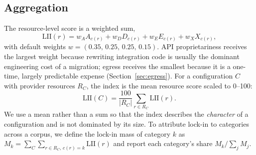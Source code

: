 \documentclass[conference]{IEEEtran}
\begin{document}
\subsection{Aggregation}
The resource-level score is a weighted sum,
\begin{equation}
\mathrm{LII}(r) = w_A A_{c(r)} + w_D D_{c(r)} + w_E E_{c(r)} + w_X X_{c(r)},
\label{eq:res}
\end{equation}
with default weights $w=(0.35,\,0.25,\,0.25,\,0.15)$. API proprietariness receives the largest weight because rewriting integration code is usually the dominant engineering cost of a migration; egress receives the smallest because it is a one-time, largely predictable expense (Section~\ref{sec:egress}). For a configuration $C$ with provider resources $R_C$, the index is the mean resource score scaled to 0--100:
\begin{equation}
\mathrm{LII}(C) = \frac{100}{|R_C|}\sum_{r\in R_C}\mathrm{LII}(r).
\label{eq:cfg}
\end{equation}
We use a mean rather than a sum so that the index describes the \emph{character} of a configuration and is not dominated by its size. To attribute lock-in to categories across a corpus, we define the lock-in mass of category $k$ as $M_k=\sum_C\sum_{r\in R_C,\,c(r)=k}\mathrm{LII}(r)$ and report each category's share $M_k/\sum_j M_j$.
\end{document}
